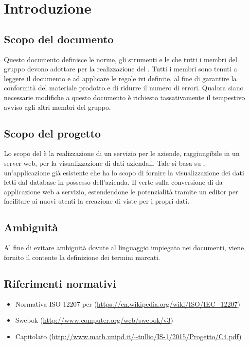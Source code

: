 \section{Introduzione}

\subsection{Scopo del documento}
Questo documento definisce le norme, gli strumenti e le  che tutti i membri del gruppo devono adottare per la realizzazione del . Tutti i membri sono tenuti a leggere il documento e ad applicare le regole ivi definite, al fine di garantire la conformità del materiale prodotto e di ridurre il numero di errori. Qualora siano necessarie modifiche a questo documento è richiesto tassativamente il tempestivo avviso agli altri membri del gruppo.


\subsection{Scopo del progetto}
Lo scopo del  è la realizzazione di un servizio per le aziende, raggiungibile in un server web, per la visualizzazione di dati aziendali. Tale  si basa su , un'applicazione già esistente che ha lo scopo di fornire la visualizzazione dei dati letti dal database  in possesso dell'azienda. Il  verte sulla conversione di  da applicazione web a servizio, estendendone le potenzialità tramite un editor per facilitare ai nuovi utenti la creazione di viste per i propri dati.

\subsection{Ambiguit\`a}
Al fine di evitare ambiguità dovute al linguaggio impiegato nei documenti, viene fornito il \Glossario contente la definizione dei termini marcati.


\subsection{Riferimenti normativi}
\begin{itemize}
\item Normativa ISO 12207 per  (\url{https://en.wikipedia.org/wiki/ISO/IEC_12207})
\item Swebok (\url{http://www.computer.org/web/swebok/v3})
\item Capitolato (\url{http://www.math.unipd.it/~tullio/IS-1/2015/Progetto/C4.pdf})
\end{itemize}

